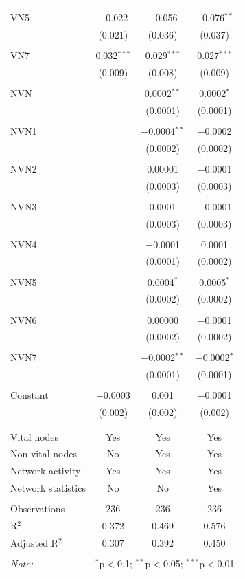 \begin{table}[!htbp]
\begin{tabular}{@{\extracolsep{5pt}}lccc}
  & & & \\ 
 VN5 & $-$0.022 & $-$0.056 & $-$0.076$^{**}$ \\ 
  & (0.021) & (0.036) & (0.037) \\ 
  & & & \\ 
 VN7 & 0.032$^{***}$ & 0.029$^{***}$ & 0.027$^{***}$ \\ 
  & (0.009) & (0.008) & (0.009) \\ 
  & & & \\ 
 NVN &  & 0.0002$^{**}$ & 0.0002$^{*}$ \\ 
  &  & (0.0001) & (0.0001) \\ 
  & & & \\ 
 NVN1 &  & $-$0.0004$^{**}$ & $-$0.0002 \\ 
  &  & (0.0002) & (0.0002) \\ 
  & & & \\ 
 NVN2 &  & 0.00001 & $-$0.0001 \\ 
  &  & (0.0003) & (0.0003) \\ 
  & & & \\ 
 NVN3 &  & 0.0001 & $-$0.0001 \\ 
  &  & (0.0003) & (0.0003) \\ 
  & & & \\ 
 NVN4 &  & $-$0.0001 & 0.0001 \\ 
  &  & (0.0001) & (0.0002) \\ 
  & & & \\ 
 NVN5 &  & 0.0004$^{*}$ & 0.0005$^{*}$ \\ 
  &  & (0.0002) & (0.0002) \\ 
  & & & \\ 
 NVN6 &  & 0.00000 & $-$0.0001 \\ 
  &  & (0.0002) & (0.0002) \\ 
  & & & \\ 
 NVN7 &  & $-$0.0002$^{**}$ & $-$0.0002$^{*}$ \\ 
  &  & (0.0001) & (0.0001) \\ 
  & & & \\ 
 Constant & $-$0.0003 & 0.001 & $-$0.0001 \\ 
  & (0.002) & (0.002) & (0.002) \\ 
  & & & \\ 
\hline \\[-1.8ex] 
Vital nodes & Yes & Yes & Yes \\ 
Non-vital nodes & No & Yes & Yes \\ 
Network activity & Yes & Yes & Yes \\ 
Network statistics & No & No & Yes \\ 
\hline &  &  &  \\ 
Observations & 236 & 236 & 236 \\ 
R$^{2}$ & 0.372 & 0.469 & 0.576 \\ 
Adjusted R$^{2}$ & 0.307 & 0.392 & 0.450 \\ 
\hline 
\hline \\[-1.8ex] 
\textit{Note:}  & \multicolumn{3}{r}{$^{*}$p$<$0.1; $^{**}$p$<$0.05; $^{***}$p$<$0.01} \\ 
\end{tabular} 
\end{table} 
